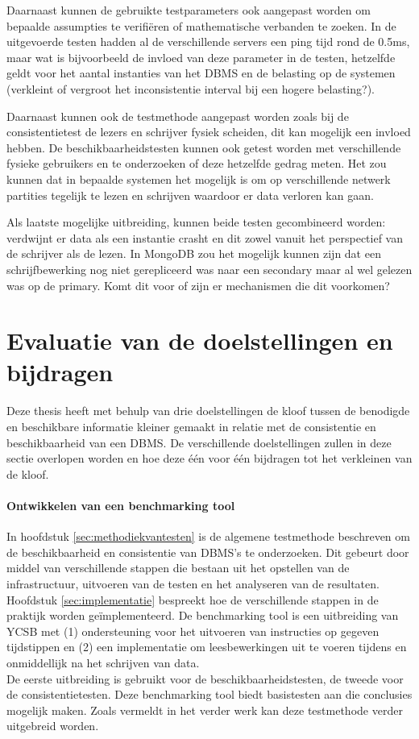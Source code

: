 Daarnaast kunnen de gebruikte testparameters ook aangepast worden om bepaalde assumpties te verifiëren of mathematische verbanden te zoeken. In de uitgevoerde testen hadden al de verschillende servers een ping tijd rond de 0.5ms, maar wat is bijvoorbeeld de invloed van deze parameter in de testen, hetzelfde geldt voor het aantal instanties van het DBMS en de belasting op de systemen (verkleint of vergroot het inconsistentie interval bij een hogere belasting?). 

Daarnaast kunnen ook de testmethode aangepast worden zoals bij de consistentietest de lezers en schrijver fysiek scheiden, dit kan mogelijk een invloed hebben. De beschikbaarheidstesten kunnen ook getest worden met verschillende fysieke gebruikers en te onderzoeken of deze hetzelfde gedrag meten. Het zou kunnen dat in bepaalde systemen het mogelijk is om op verschillende netwerk partities tegelijk te lezen en schrijven waardoor er data verloren kan gaan. 

Als laatste mogelijke uitbreiding, kunnen beide testen gecombineerd worden: verdwijnt er data als een instantie crasht en dit zowel vanuit het perspectief van de schrijver als de lezen. In MongoDB zou het mogelijk kunnen zijn dat een schrijfbewerking nog niet gerepliceerd was naar een secondary maar al wel gelezen was op de primary. Komt dit voor of zijn er mechanismen die dit voorkomen?  

\section{Evaluatie van de doelstellingen en bijdragen}
Deze thesis heeft met behulp van drie doelstellingen de kloof tussen de benodigde en beschikbare informatie kleiner gemaakt in relatie met de consistentie en beschikbaarheid van een DBMS. De verschillende doelstellingen zullen in deze sectie overlopen worden en hoe deze één voor één bijdragen tot het verkleinen van de kloof. 

\paragraph{Ontwikkelen van een benchmarking tool} In hoofdstuk \ref{sec:methodiekvantesten} is de algemene testmethode beschreven om de beschikbaarheid en consistentie van DBMS's te onderzoeken. Dit gebeurt door middel van verschillende stappen die bestaan uit het opstellen van de infrastructuur, uitvoeren van de testen en het analyseren van de resultaten. Hoofdstuk \ref{sec:implementatie} bespreekt hoe de verschillende stappen in de praktijk worden geïmplementeerd. De benchmarking tool is een uitbreiding van YCSB\cite{cooper2010benchmarking} met (1) ondersteuning voor het uitvoeren van instructies op gegeven tijdstippen en (2) een implementatie om leesbewerkingen uit te voeren tijdens en onmiddellijk na het schrijven van data. \\
De eerste uitbreiding is gebruikt voor de beschikbaarheidstesten, de tweede voor de consistentietesten. Deze benchmarking tool biedt basistesten aan die conclusies mogelijk maken. Zoals vermeldt in het verder werk kan deze testmethode verder uitgebreid worden. 

